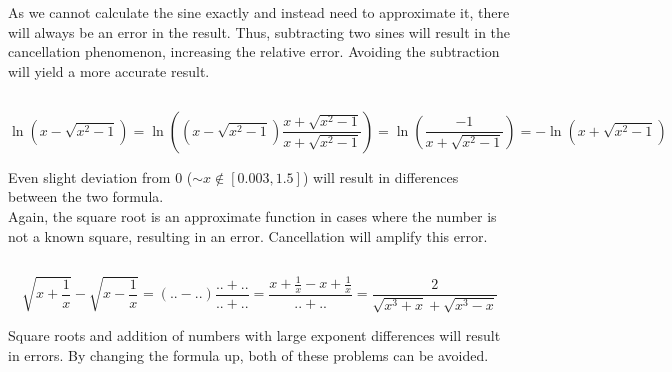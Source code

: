 As we cannot calculate the sine exactly and instead need to approximate it, there will always be an error in the result. Thus, subtracting two sines will result in the cancellation phenomenon, increasing the relative error. Avoiding the subtraction will yield a more accurate result.

\subsection{}
$$ \ln(x-\sqrt{x^2-1}) = \ln\left((x-\sqrt{x^2-1})\frac{x+\sqrt{x^2-1}}{x+\sqrt{x^2-1}}\right) = \ln\left(\frac{-1}{x+\sqrt{x^2-1}}\right) = -\ln(x+\sqrt{x^2-1}) $$

Even slight deviation from $0$ ($\sim x\notin [0.003,1.5]$) will result in differences between the two formula. \\

Again, the square root is an approximate function in cases where the number is not a known square, resulting in an error. Cancellation will amplify this error.

\subsection{}
$$ \sqrt{x+\frac{1}{x}}-\sqrt{x-\frac{1}{x}} = (..-..)\frac{..+..}{..+..} = \frac{x+\frac{1}{x}-x+\frac{1}{x}}{..+..} = \frac{2}{\sqrt{x^3+x}+\sqrt{x^3-x}} $$

Square roots and addition of numbers with large exponent differences will result in errors. By changing the formula up, both of these problems can be avoided.



